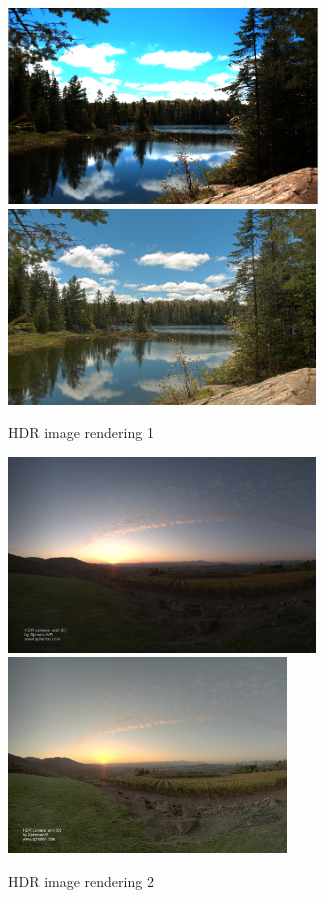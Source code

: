 \documentclass[10pt,twocolumn,letterpaper]{article}
\begin{document}
\begin{figure}[H]
\begin{center}
\includegraphics[height=14em]{images/peaklake_original.jpg}
\includegraphics[height=14em]{images/PeckLakegf4.jpg}
\end{center}
   \caption{HDR image rendering 1}
\label{example1}
\end{figure}

\begin{figure}[H]
\begin{center}
\includegraphics[height=14em]{images/valley_original.jpg}
\includegraphics[height=14em]{images/valley_processed.jpg}
\end{center}
\caption{HDR image rendering 2}
\label{example2}
\end{figure}
\end{document}

